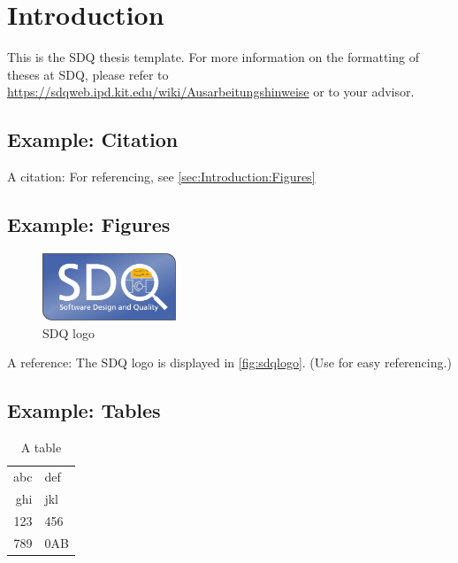 
\chapter{Introduction}
\label{ch:Introduction}


This is the SDQ thesis template.
For more information on the formatting of theses at SDQ, please refer to
\url{https://sdqweb.ipd.kit.edu/wiki/Ausarbeitungshinweise} or to your advisor.

\section{Example: Citation}
\label{sec:Introduction:Citation}
A citation: \cite{becker2008a} For referencing, see \autoref{sec:Introduction:Figures}

\section{Example: Figures}
\label{sec:Introduction:Figures}
\begin{figure}[h]
\centering
\includegraphics[width=4cm]{logos/sdqlogo}
\caption{SDQ logo}
\label{fig:sdqlogo}
\end{figure}

A reference: The SDQ logo is displayed in \autoref{fig:sdqlogo}. 
(Use  for easy referencing.) 

\section{Example: Tables}
\label{sec:Introduction:Tables}
\begin{table}[h]
\centering
\begin{tabular}{r l}
\toprule
abc & def\\
ghi & jkl\\
\midrule
123 & 456\\
789 & 0AB\\
\bottomrule
\end{tabular}
\caption{A table}
\label{tab:atable}
\end{table}

